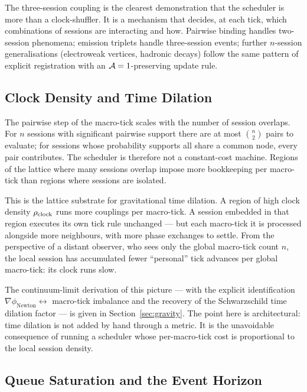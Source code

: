 The three-session coupling is the clearest demonstration that the
scheduler is more than a clock-shuffler.
It is a mechanism that decides, at each tick, which combinations of
sessions are interacting and how.
Pairwise binding handles two-session phenomena; emission triplets
handle three-session events; further $n$-session generalisations
(electroweak vertices, hadronic decays) follow the same pattern of
explicit registration with an $\mathcal{A}=1$-preserving update rule.

\subsection{Clock Density and Time Dilation}
\label{subsec:density_dilation}

The pairwise step of the macro-tick scales with the number of session
overlaps.
For $n$ sessions with significant pairwise support there are at most
$\binom{n}{2}$ pairs to evaluate; for sessions whose probability supports
all share a common node, every pair contributes.
The scheduler is therefore not a constant-cost machine.
Regions of the lattice where many sessions overlap impose more
bookkeeping per macro-tick than regions where sessions are isolated.

This is the lattice substrate for gravitational time dilation.
A region of high clock density $\rho_{\mathrm{clock}}$ runs more couplings per
macro-tick.
A session embedded in that region executes its own tick rule
unchanged --- but each macro-tick it is processed alongside more
neighbours, with more phase exchanges to settle.
From the perspective of a distant observer, who sees only the global
macro-tick count $n$, the local session has accumulated fewer
``personal'' tick advances per global macro-tick: its clock runs slow.

The continuum-limit derivation of this picture --- with the explicit
identification $\nabla\phi_\text{Newton} \leftrightarrow$ macro-tick
imbalance and the recovery of the Schwarzschild time dilation factor
--- is given in Section~\ref{sec:gravity}.
The point here is architectural: time dilation is not added by hand
through a metric.
It is the unavoidable consequence of running a scheduler whose
per-macro-tick cost is proportional to the local session density.

\subsection{Queue Saturation and the Event Horizon}
\label{subsec:saturation}

